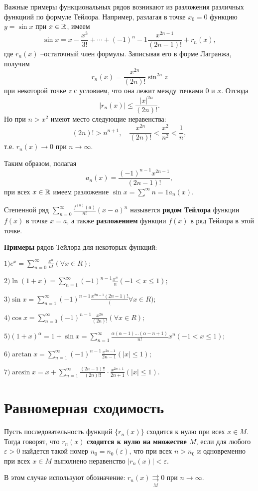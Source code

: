 Важные примеры функциональных рядов возникают из разложения различных функциий по формуле Тейлора. Например, разлагая в точке $x_0=0$ функцию $y=\sin x$ при $x \in \mathbb R$, имеем $$\sin x=x-\frac{x^3}{3!}+\cdots+(-1)^n-1\frac{x^{2n-1}}{(2n-1)!}+r_n(x),$$ где $r_n(x)$ --остаточный член формулы. Записывая его в форме Лагранжа, получим $$r_n(x)=\frac{x^{2n}}{(2n)!}\sin^{2n} z$$ при некоторой точке $z$ с условием, что она лежит между точками $0$ и $x$. Отсюда $$|r_n(x)|\le\frac{|x|^{2n}}{(2n)!}.$$ Но при $n>x^2$ имеют место следующие неравенства: $$(2n)!>n^{n+1},\quad \frac{x^{2n}}{(2n)!}<\frac{x^2}{n^2}<\frac{1}{n},$$ т.е. $r_n(x)\to 0$ при $n\to \infty$.

Таким образом, полагая $$a_n(x)=\frac{(-1)^{n-1}x^{2n-1}}{(2n-1)!},$$ при всех $x \in \mathbb R$ имеем разложение $\sin x=\sum^{\infty}{n=1}a_n(x).$

\begin{object} Степенной ряд $\sum^{\infty}_{n=0}\frac{f^{(n)}(a)}{n!}(x-a)^n$ назывется \textbf{рядом Тейлора} функции $f(x)$ в точке $x=a$, а также \textbf{разложением} функции $f(x)$ в ряд Тейлора в этой точке.\end{object}\smallskip

\textbf{Примеры} рядов Тейлора для некоторых функций:

$1) e^x=\sum^{\infty}_{n=0}\frac{x^n}{n!}(\forall x\in R);$\smallskip

$2)\ln(1+x)=\sum^{\infty}_{n=1}(-1)^{n-1}\frac{x^n}{n}(-1<x\le1);$\smallskip

$3)\sin x=\sum^{\infty}_{n=1}(-1)^{n-1}\frac{x^{2n-1}{(2n-1)!}}(\forall x\in R);$\smallskip

$4)\cos x=\sum^{\infty}_{n=0}(-1)^{n-1}\frac{x^{2n}}{(2n)!}(\forall x\in R);$\smallskip

$5) (1+x)^\alpha=1+\sin x=\sum^{\infty}_{n=1}\frac{\alpha(\alpha-1)\ldots(\alpha-n+1)}{n!}x^n (-1<x\le1);$\smallskip

$6) \arctan x=\sum^{\infty}_{n=1}(-1)^{n-1}\frac{x^{2n-1}}{2n-1}(|x|\le1);$\smallskip

$7) \arcsin x=x+\sum^{\infty}_{n=1}\frac{(2n-1)!!}{(2n)!!}\cdot\frac{x^{2n+1}}{2n+1}(|x|\le1).$


\section{Равномерная сходимость}


\begin{object} Пусть последовательность функций $\{ r_n(x)\}$ сходится к нулю при всех $x \in M$. Тогда говорят, что $r_n(x)$ \textbf{сходится к нулю на множестве $M$}, если для любого $\varepsilon >0$ найдется такой номер $n_0=n_0(\varepsilon)$, что при всех $n>n_0$ и одновременно при всех $x \in M$ выполнено неравенство $|r_n(x)|<\varepsilon$.\smallskip

В этом случае используют обозначение: $r_n(x)\mathop{\rightrightarrows}\limits_{M} 0$ при $n\rightarrow \infty$.\end{object}\smallskip

